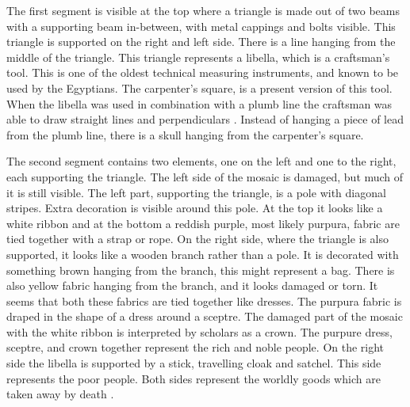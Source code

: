 	The first segment is visible at the top where a triangle is made out of two beams with a supporting beam in-between, with metal cappings and bolts visible. This triangle is supported on the right and left side. There is a line hanging from the middle of the triangle. This triangle represents a libella, which is a craftsman’s tool. This is one of the oldest technical measuring instruments, and known to be used by the Egyptians. The carpenter’s square, is a present version of this tool. When the libella was used in combination with a plumb line the craftsman was able to draw straight lines and perpendiculars \parencite [84] {Cuomo_2007}. Instead of hanging a piece of lead from the plumb line, there is a skull hanging from the carpenter’s square. 

	The second segment contains two elements, one on the left and one to the right, each supporting the triangle. The left side of the mosaic is damaged, but much of it is still visible. The left part, supporting the triangle, is a pole with diagonal stripes. Extra decoration is visible around this pole. At the top it looks like a white ribbon and at the bottom a reddish purple, most likely purpura, fabric are tied together with a strap or rope. On the right side, where the triangle is also supported, it looks like a wooden branch rather than a pole. It is decorated with something brown hanging from the branch, this might represent a bag. There is also yellow fabric hanging from the branch, and it looks damaged or torn. It seems that both these fabrics are tied together like dresses.
	The purpura fabric is draped in the shape of a dress around a sceptre. The damaged part of the mosaic with the white ribbon is interpreted by scholars as a crown. The purpure dress, sceptre, and crown together represent the rich and noble people. On the right side the libella is supported by a stick, travelling cloak and satchel. This side represents the poor people. Both sides represent the worldly goods which are taken away by death \parencites[99--100]{Cuomo_2007}[9]{Sogliano_1874}. 


